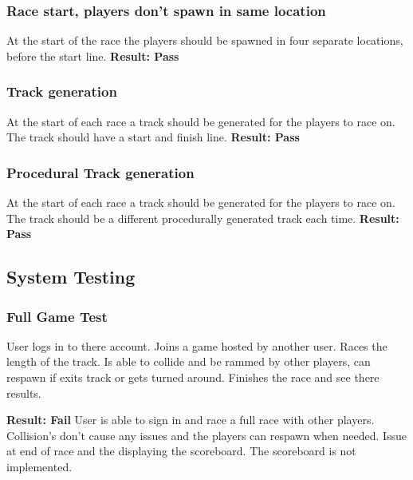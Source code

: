 \subsubsection{Race start, players don't spawn in same location}\newline
At the start of the race the players should be spawned in four separate locations, before the start line.\newline
\textbf{Result: Pass}\newline

\subsubsection{Track generation}\newline
At the start of each race a track should be generated for the players to race on. The track should have a start and finish line.\newline 
\textbf{Result: Pass}\newline
 
\subsubsection{Procedural Track generation}\newline
At the start of each race a track should be generated for the players to race on. The track should be a different procedurally generated track each time.\newline
\textbf{Result: Pass}\newline


\subsection{System Testing } \newline

\subsubsection{Full Game Test }\newline
User logs in to there account. Joins a game hosted by another user. Races the length of the track. Is able to collide and be rammed by other players, can respawn if exits track or gets turned around. Finishes the race and see there results.\newline

\textbf{Result: Fail} User is able to sign in and race a full race with other players. Collision's don't cause any issues and the players can respawn when needed. Issue at end of race and the displaying the scoreboard. The scoreboard is not implemented. 



